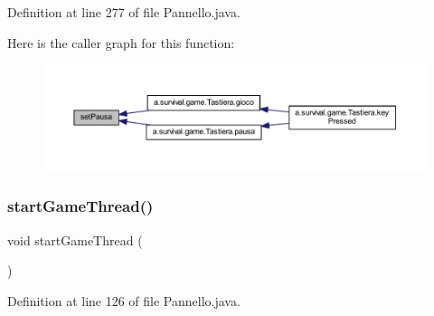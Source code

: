 Definition at line 277 of file Pannello.\+java.

Here is the caller graph for this function\+:
\nopagebreak
\begin{figure}[H]
\begin{center}
\leavevmode
\includegraphics[width=350pt]{classa_1_1survival_1_1game_1_1_pannello_a2283a8c1211827155404ab0ccb5c65c4_icgraph}
\end{center}
\end{figure}
\mbox{\label{classa_1_1survival_1_1game_1_1_pannello_aeadd7c80de430e172e3231afe0d94bd1}} 
\subsubsection{\texorpdfstring{start\+Game\+Thread()}{startGameThread()}}
{\footnotesize\ttfamily void start\+Game\+Thread (\begin{DoxyParamCaption}{ }\end{DoxyParamCaption})}



Definition at line 126 of file Pannello.\+java.

